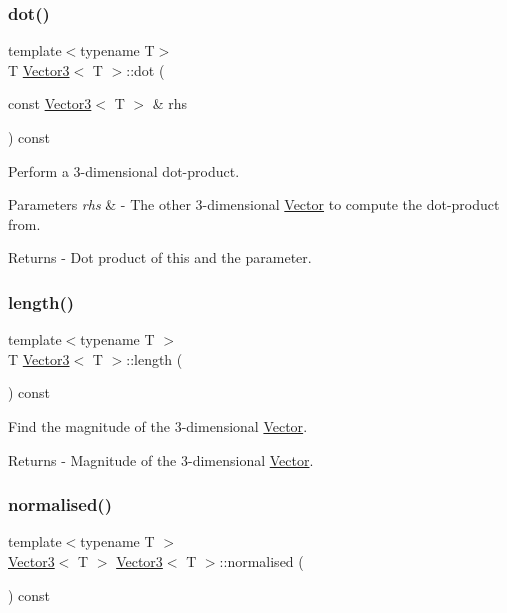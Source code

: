\subsubsection{\texorpdfstring{dot()}{dot()}}
{\footnotesize\ttfamily template$<$typename T$>$ \\
T \mbox{\hyperlink{class_vector3}{Vector3}}$<$ T $>$\+::dot (\begin{DoxyParamCaption}\item[{const \mbox{\hyperlink{class_vector3}{Vector3}}$<$ T $>$ \&}]{rhs }\end{DoxyParamCaption}) const}

Perform a 3-\/dimensional dot-\/product. 
\begin{DoxyParams}{Parameters}
{\em rhs} & -\/ The other 3-\/dimensional \mbox{\hyperlink{class_vector}{Vector}} to compute the dot-\/product from. \\
\hline
\end{DoxyParams}
\begin{DoxyReturn}{Returns}
-\/ Dot product of this and the parameter. 
\end{DoxyReturn}
\mbox{\label{class_vector3_aa5177b38edaae3717bc94443946345d0}} 
\subsubsection{\texorpdfstring{length()}{length()}}
{\footnotesize\ttfamily template$<$typename T $>$ \\
T \mbox{\hyperlink{class_vector3}{Vector3}}$<$ T $>$\+::length (\begin{DoxyParamCaption}{ }\end{DoxyParamCaption}) const}

Find the magnitude of the 3-\/dimensional \mbox{\hyperlink{class_vector}{Vector}}. \begin{DoxyReturn}{Returns}
-\/ Magnitude of the 3-\/dimensional \mbox{\hyperlink{class_vector}{Vector}}. 
\end{DoxyReturn}
\mbox{\label{class_vector3_a527c54e392f3aa4b942df2eb7aa3b38b}} 
\subsubsection{\texorpdfstring{normalised()}{normalised()}}
{\footnotesize\ttfamily template$<$typename T $>$ \\
\mbox{\hyperlink{class_vector3}{Vector3}}$<$ T $>$ \mbox{\hyperlink{class_vector3}{Vector3}}$<$ T $>$\+::normalised (\begin{DoxyParamCaption}{ }\end{DoxyParamCaption}) const}

